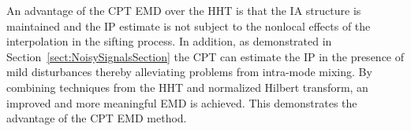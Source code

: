 \documentclass[journal,11pt,a4paper,onecolumn,draftcls]{IEEEtran}
\begin{document}
An advantage of the CPT EMD over the HHT is that the IA structure is maintained and the IP estimate is not subject to the nonlocal effects of the interpolation in the sifting process. In addition, as demonstrated in Section~\ref{sect:NoisySignalsSection} the CPT can estimate the IP in the presence of mild disturbances thereby alleviating problems from intra-mode mixing. By combining techniques from the HHT and normalized Hilbert transform, an improved and more meaningful EMD is achieved. This demonstrates the advantage of the CPT EMD method. %
% 
% 
% 
\end{document}

